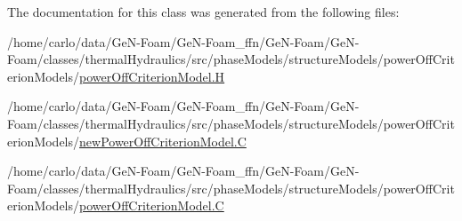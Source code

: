The documentation for this class was generated from the following files\+:\begin{DoxyCompactItemize}
\item 
/home/carlo/data/\+Ge\+N-\/\+Foam/\+Ge\+N-\/\+Foam\+\_\+ffn/\+Ge\+N-\/\+Foam/\+Ge\+N-\/\+Foam/classes/thermal\+Hydraulics/src/phase\+Models/structure\+Models/power\+Off\+Criterion\+Models/\hyperlink{powerOffCriterionModel_8H}{power\+Off\+Criterion\+Model.\+H}\item 
/home/carlo/data/\+Ge\+N-\/\+Foam/\+Ge\+N-\/\+Foam\+\_\+ffn/\+Ge\+N-\/\+Foam/\+Ge\+N-\/\+Foam/classes/thermal\+Hydraulics/src/phase\+Models/structure\+Models/power\+Off\+Criterion\+Models/\hyperlink{newPowerOffCriterionModel_8C}{new\+Power\+Off\+Criterion\+Model.\+C}\item 
/home/carlo/data/\+Ge\+N-\/\+Foam/\+Ge\+N-\/\+Foam\+\_\+ffn/\+Ge\+N-\/\+Foam/\+Ge\+N-\/\+Foam/classes/thermal\+Hydraulics/src/phase\+Models/structure\+Models/power\+Off\+Criterion\+Models/\hyperlink{powerOffCriterionModel_8C}{power\+Off\+Criterion\+Model.\+C}\end{DoxyCompactItemize}
